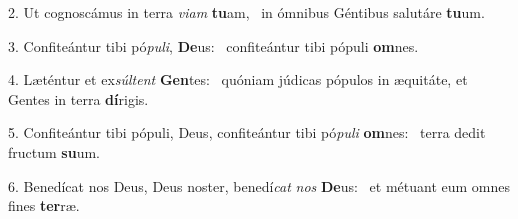 2. Ut cognoscámus in terra \textit{vi}\textit{am} \textbf{tu}am, \ast\  in ómnibus Géntibus salutáre \textbf{tu}um.\

3. Confiteántur tibi pó\textit{pu}\textit{li}, \textbf{De}us: \ast\  confiteántur tibi pópuli \textbf{om}nes.\

4. Læténtur et ex\textit{súl}\textit{tent} \textbf{Gen}tes: \ast\  quóniam júdicas pópulos in æquitáte, et Gentes in terra \textbf{dí}rigis.\

5. Confiteántur tibi pópuli, Deus, confiteántur tibi pó\textit{pu}\textit{li} \textbf{om}nes: \ast\  terra dedit fructum \textbf{su}um.\

6. Benedícat nos Deus, Deus noster, benedí\textit{cat} \textit{nos} \textbf{De}us: \ast\  et métuant eum omnes fines \textbf{ter}ræ.\

